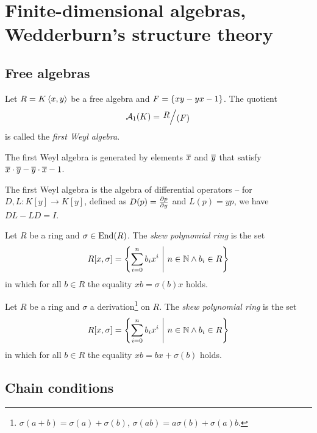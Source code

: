 \section{Finite-dimensional algebras, Wedderburn's structure theory}

\subsection{Free algebras}


\begin{definicija}
Let $R = K \left\langle x, y\right\rangle$ be a free algebra and
$F = \left\{xy - yx - 1\right\}$. The quotient
\[
\mathcal{A}_1(K) = \kvoc{R}{(F)}
\]
is called the \emph{first Weyl algebra}.
\end{definicija}

\begin{opomba}
The first Weyl algebra is generated by elements $\overline{x}$ and
$\overline{y}$ that satisfy
$\overline{x} \cdot \overline{y} - \overline{y} \cdot \overline{x} - 1$.
\end{opomba}

\begin{opomba}
The first Weyl algebra is the algebra of differential operators --
for $D, L \colon K[y] \to K[y]$, defined as $D(p) = \frac{\partial p}{\partial y}$
and $L(p) = yp$, we have $DL - LD = I$.
\end{opomba}

\begin{definicija}
Let $R$ be a ring and $\sigma \in \operatorname{End}(R)$. The
\emph{skew polynomial ring} is the set
\[
R[x, \sigma] =
\left\{\sum_{i=0}^n b_i x^i~\middle\vert~n \in \mathbb{N} \land b_i \in R\right\}
\]
in which for all $b \in R$ the equality $x b = \sigma(b) x$ holds.
\end{definicija}

\begin{definicija}
Let $R$ be a ring and $\sigma$ a
derivation\footnote{$\sigma(a+b) = \sigma(a) + \sigma(b)$,
$\sigma(ab) = a\sigma(b) + \sigma(a)b$.} on $R$. The
\emph{skew polynomial ring} is the set
\[
R[x, \sigma] =
\left\{\sum_{i=0}^n b_i x^i~\middle\vert~n \in \mathbb{N} \land b_i \in R\right\}
\]
in which for all $b \in R$ the equality $x b = b x + \sigma(b)$
holds.
\end{definicija}

\newpage

\subsection{Chain conditions}

